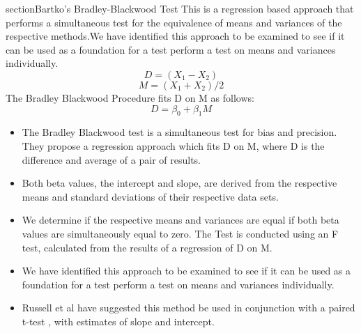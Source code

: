 \documentclass[12pt, a4paper]{report}
\theoremstyle{plain}
\theoremstyle{definition}
\theoremstyle{remark}
\begin{document}
	section{Bartko's Bradley-Blackwood Test}
	This is a regression based
	approach that performs a simultaneous test for the equivalence of
	means and variances of the respective methods.We have identified
	this approach  to be examined to see if it can be used as a
	foundation for a test perform a test on
	means and variances individually.
	\begin{equation}
	D = (X_{1}-X_{2})
	\end{equation}
	\begin{equation}
	M = (X_{1} + X_{2}) /2
	\end{equation}
	The Bradley Blackwood Procedure fits D on M as follows:\\
	\begin{equation}
	D = \beta_{0} + \beta_{1}M
	\end{equation}
	\begin{itemize}
		\item The Bradley Blackwood test is a simultaneous test for bias and
		precision. They propose a regression approach which fits D on M,
		where D is the difference and average of a pair of results.
		\item Both beta values, the intercept and slope, are derived from the respective means and
		standard deviations of their respective data sets.
		\item We determine if the respective means and variances are equal if
		both beta values are simultaneously equal to zero. The Test is
		conducted using an F test, calculated from the results of a
		regression of D on M.
		\item We have identified this approach  to be examined to see if it can
		be used as a foundation for a test perform a test on means and
		variances individually.
		\item Russell et al have suggested this method be used in conjunction
		with a paired t-test , with estimates of slope and intercept.
	\end{itemize}
	
	
\end{document}
